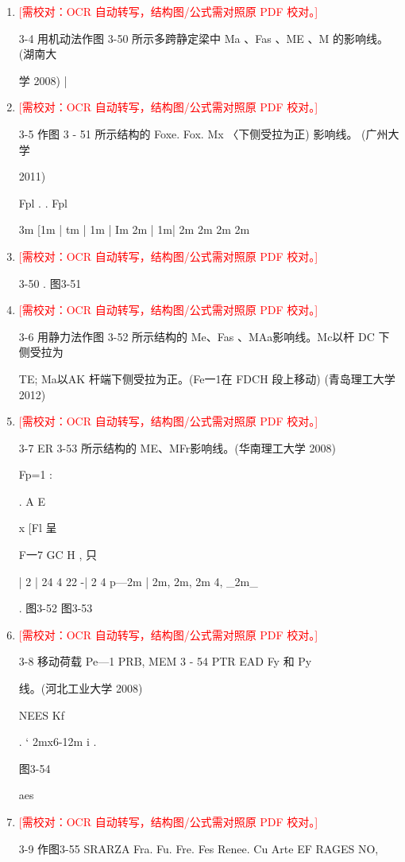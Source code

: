\documentclass[UTF8,12pt,a4paper,openany]{ctexbook}
\newcommand{\TODO}[1]{\textcolor{red}{[需校对：#1]}}
\begin{document}
\begin{enumerate}[label=\textbf{\arabic*.},leftmargin=2em]
\item \TODO{OCR 自动转写，结构图/公式需对照原 PDF 校对。}\par 3-4 用机动法作图 3-50 所示多跨静定梁中 Ma 、Fas 、ME 、M 的影响线。 (湖南大\par 学 2008)    |
\item \TODO{OCR 自动转写，结构图/公式需对照原 PDF 校对。}\par 3-5 作图 3 - 51 所示结构的 Foxe. Fox. Mx 〈下侧受拉为正) 影响线。 (广州大学\par 2011)\par Fpl    .      .                     Fpl\par 3m   [1m | tm | 1m | Im  2m  | 1m|  2m    2m  2m  2m
\item \TODO{OCR 自动转写，结构图/公式需对照原 PDF 校对。}\par 3-50      .                   图3-51
\item \TODO{OCR 自动转写，结构图/公式需对照原 PDF 校对。}\par 3-6  用静力法作图 3-52 所示结构的 Me、Fas 、MAa影响线。Mc以杆 DC 下侧受拉为\par TE; Ma以AK 杆端下侧受拉为正。(Fe一1在 FDCH 段上移动) (青岛理工大学 2012)
\item \TODO{OCR 自动转写，结构图/公式需对照原 PDF 校对。}\par 3-7 ER 3-53 所示结构的 ME、MFr影响线。(华南理工大学 2008)\par Fp=1      :\par .                       A               E\par x [Fl                                                      呈\par F一7    GC        H    ,                                 只\par | 2 | 24 4 22 -| 2 4    p—2m | 2m, 2m, 2m 4, \_2m\_\par .       图3-52                 图3-53
\item \TODO{OCR 自动转写，结构图/公式需对照原 PDF 校对。}\par 3-8 移动荷载 Pe—1 PRB, MEM 3 - 54 PTR EAD Fy 和 Py\par 线。(河北工业大学 2008)\par NEES Kf\par .       ‘          2mx6-12m     i  .\par 图3-54\par aes
\item \TODO{OCR 自动转写，结构图/公式需对照原 PDF 校对。}\par 3-9 作图3-55 SRARZA Fra. Fu. Fre. Fes Renee. Cu Arte EF RAGES NO,

\end{enumerate}
\end{document}
